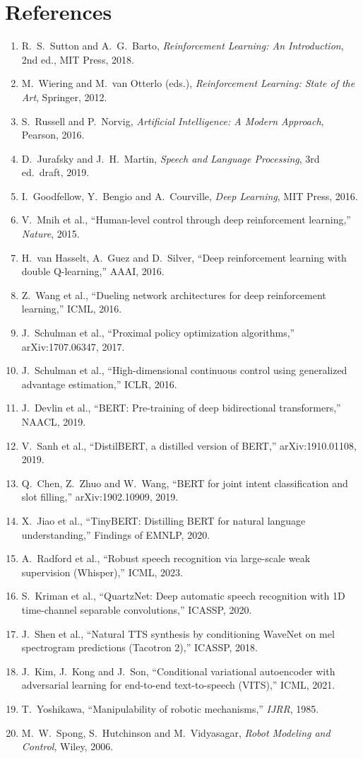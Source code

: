 \documentclass[11pt,a4paper]{article}
\begin{document}
\section*{References}
\small
\begin{enumerate}[leftmargin=*]
\item R.~S.~Sutton and A.~G.~Barto, \emph{Reinforcement Learning: An Introduction}, 2nd ed., MIT Press, 2018.
\item M.~Wiering and M.~van Otterlo (eds.), \emph{Reinforcement Learning: State of the Art}, Springer, 2012.
\item S.~Russell and P.~Norvig, \emph{Artificial Intelligence: A Modern Approach}, Pearson, 2016.
\item D.~Jurafsky and J.~H.~Martin, \emph{Speech and Language Processing}, 3rd ed.\ draft, 2019.
\item I.~Goodfellow, Y.~Bengio and A.~Courville, \emph{Deep Learning}, MIT Press, 2016.
\item V.~Mnih et al., ``Human-level control through deep reinforcement learning,'' \emph{Nature}, 2015.
\item H.~van Hasselt, A.~Guez and D.~Silver, ``Deep reinforcement learning with double Q-learning,'' AAAI, 2016.
\item Z.~Wang et al., ``Dueling network architectures for deep reinforcement learning,'' ICML, 2016.
\item J.~Schulman et al., ``Proximal policy optimization algorithms,'' arXiv:1707.06347, 2017.
\item J.~Schulman et al., ``High-dimensional continuous control using generalized advantage estimation,'' ICLR, 2016.
\item J.~Devlin et al., ``BERT: Pre-training of deep bidirectional transformers,'' NAACL, 2019.
\item V.~Sanh et al., ``DistilBERT, a distilled version of BERT,'' arXiv:1910.01108, 2019.
\item Q.~Chen, Z.~Zhuo and W.~Wang, ``BERT for joint intent classification and slot filling,'' arXiv:1902.10909, 2019.
\item X.~Jiao et al., ``TinyBERT: Distilling BERT for natural language understanding,'' Findings of EMNLP, 2020.
\item A.~Radford et al., ``Robust speech recognition via large-scale weak supervision (Whisper),'' ICML, 2023.
\item S.~Kriman et al., ``QuartzNet: Deep automatic speech recognition with 1D time-channel separable convolutions,'' ICASSP, 2020.
\item J.~Shen et al., ``Natural TTS synthesis by conditioning WaveNet on mel spectrogram predictions (Tacotron 2),'' ICASSP, 2018.
\item J.~Kim, J.~Kong and J.~Son, ``Conditional variational autoencoder with adversarial learning for end-to-end text-to-speech (VITS),'' ICML, 2021.
\item T.~Yoshikawa, ``Manipulability of robotic mechanisms,'' \emph{IJRR}, 1985.
\item M.~W.~Spong, S.~Hutchinson and M.~Vidyasagar, \emph{Robot Modeling and Control}, Wiley, 2006.
\end{enumerate}
\end{document}
